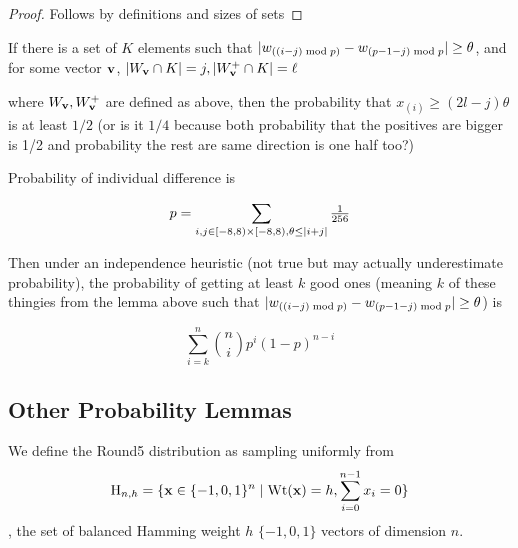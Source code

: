 \begin{proof}
Follows by definitions and sizes of sets 
\end{proof}

\begin{conjecture}
If there is a set of $K$ elements such that
$\lvert w_{((i-j)\bmod{p})}-w_{(p-1-j)\bmod{p}}\rvert\geq \theta$, and for
some vector $\mathbf{v}$, 
$\lvert W_{\mathbf{v}} \cap K\rvert =
  j,\lvert W_{\mathbf{v}}^{+} \cap K\rvert= \ell$

where $W_{\mathbf{v}}, W_{\mathbf{v}}^{+}$ are defined as above, then the
probability that $x_{(i)} \geq (2l-j)\theta$ is at least $1/2$ (or is
it $1/4$ because both probability that the positives are bigger is 1/2
and probability the rest are same direction is one half too?)
\end{conjecture}

\begin{fact}
Probability of individual difference is 

\[p=\sum_{i,j \in [-8,8)\times [-8,8),\theta \leq \lvert i+j\rvert}\tfrac{1}{256}\]

Then under an independence heuristic (not true but may actually
underestimate probability), the probability of getting at least $k$
good  ones (meaning $k$ of these thingies from the lemma above such that  $\lvert w_{((i-j)\bmod{p})}-w_{(p-1-j)\bmod{p}}\rvert\geq \theta$)
is  

\[\sum_{i=k}^{n} \binom{n}{i}p^{i}(1-p)^{n-i}\]



\end{fact}

\subsection{Other Probability Lemmas}
\label{sec:other-prob-lemm}


\begin{definition}
\label{def:round5_dist}
We define the Round5 distribution as sampling uniformly from 
\[\text{H}_{n,h} = \{\mathbf{x} \in \{-1,0,1\}^{n} \mid
  \text{Wt}(\mathbf{x})=h,\sum_{i=0}^{n-1}x_i=0\}\], the set of balanced Hamming weight $h$ $\{-1,0,1\}$ vectors of dimension $n$.
\end{definition}

